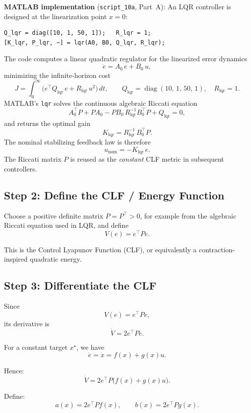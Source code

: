 \documentclass[11pt,a4paper]{article}
\begin{document}
\noindent\textbf{MATLAB implementation} (\texttt{script\_10a}, Part~A): An LQR controller is designed at the linearization point \(x=0\):

\begin{lstlisting}
Q_lqr = diag([10, 1, 50, 1]);   R_lqr = 1;
[K_lqr, P_lqr, ~] = lqr(A0, B0, Q_lqr, R_lqr);
\end{lstlisting}

\begin{codemath}
The code computes a linear quadratic regulator for the linearized error dynamics
\[
\dot e = A_0\, e + B_0\, u,
\]
minimizing the infinite-horizon cost
\[
J = \int_0^\infty \bigl( e^\top Q_{\mathrm{lqr}}\, e + R_{\mathrm{lqr}}\, u^2 \bigr)\,dt,
\qquad
Q_{\mathrm{lqr}} = \operatorname{diag}(10,\,1,\,50,\,1),
\quad
R_{\mathrm{lqr}} = 1.
\]
MATLAB's \texttt{lqr} solves the continuous algebraic Riccati equation
\[
A_0^\top P + P A_0 - P B_0\, R_{\mathrm{lqr}}^{-1} B_0^\top P + Q_{\mathrm{lqr}} = 0,
\]
and returns the optimal gain
\[
K_{\mathrm{lqr}} = R_{\mathrm{lqr}}^{-1}\, B_0^\top P.
\]
The nominal stabilizing feedback law is therefore
\[
u_{\mathrm{nom}} = -K_{\mathrm{lqr}}\, e.
\]
The Riccati matrix \(P\) is reused as the \emph{constant} CLF metric in subsequent controllers.
\end{codemath}

\subsection{Step 2: Define the CLF / Energy Function}

Choose a positive definite matrix \(P=P^\top>0\), for example from the algebraic Riccati equation used in LQR, and define
\[
V(e) = e^\top P e.
\]

This is the Control Lyapunov Function (CLF), or equivalently a contraction-inspired quadratic energy.

\subsection{Step 3: Differentiate the CLF}

Since
\[
V(e)=e^\top P e,
\]
its derivative is
\[
\dot V = 2e^\top P \dot e.
\]

For a constant target \(x^\star\), we have
\[
\dot e = \dot x = f(x)+g(x)u.
\]

Hence:
\[
\dot V = 2e^\top P\bigl(f(x)+g(x)u\bigr).
\]

Define:
\[
a(x) = 2e^\top P f(x),
\qquad
b(x) = 2e^\top P g(x).
\]
\end{document}
